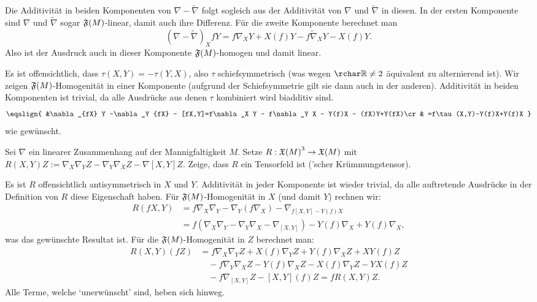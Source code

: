 \documentclass{article}
\begin{document}
\begin{solution}
    \begin{tasks}
        \item
        Die Additivität in beiden Komponenten von $\nabla - \tilde\nabla$ folgt sogleich aus der Additivität von $\nabla$ und $\tilde \nabla$ in diesen. In der ersten Komponente sind $\nabla$ und $\tilde \nabla$ sogar $\mathfrak{F}(M)$-linear, damit auch ihre Differenz. Für die zweite Komponente berechnet man
        $$
        {(\nabla-\tilde\nabla)}_X {fY}=f\nabla_X Y+X(f)Y-f\tilde\nabla_X Y -X(f)Y.
        $$
        Also ist der Ausdruck auch in dieser Komponente $\mathfrak{F}(M)$-homogen und damit linear.
            \item
        Es ist offensichtlich, dass $\tau(X,Y)=-\tau(Y,X)$, also $\tau$ schiefsymmetrisch (was wegen $\rchar\reals\neq 2$ äquivalent zu alternierend ist). Wir zeigen $\mathfrak{F}(M)$-Homogenität in einer Komponente (aufgrund der Schiefsymmetrie gilt sie dann auch in der anderen). Additivität in beiden Komponenten ist trivial, da alle Ausdrücke aus denen $\tau$ kombiniert wird biadditiv sind.
        $$
        \eqalign{
            &\nabla_{fX} Y -\nabla_Y {fX} - [fX,Y]=f\nabla_X Y - f\nabla_Y X - Y(f)X - (fX)Y+Y(fX)\cr
            & =f\tau(X,Y)-Y(f)X+Y(f)X  
        }
        $$
        wie gewünscht.
    \end{tasks}
\end{solution}

\begin{exercise}
    Sei $\nabla$ ein linearer Zusammenhang auf der Mannigfaltigkeit $M$.
    Setze $R:{\mathfrak{X}(M)}^3\rightarrow\mathfrak{X}(M)$ mit $R(X,Y)Z:=\nabla_X\nabla_Y Z - \nabla_Y\nabla_X Z -\nabla{[X,Y]} Z$. Zeige, dass $R$ ein Tensorfeld ist ('scher Krümmungstensor).
\end{exercise}

\begin{solution}
    Es ist $R$ offensichtlich antisymmetrisch in $X$ und $Y$. Additivität in jeder Komponente ist wieder trivial, da alle auftretende Ausdrücke in der Definition von $R$ diese Eigenschaft haben.
    Für $\mathfrak{F}(M)$-Homogenität in $X$ (und damit $Y$) rechnen wir:
    \begin{align*}
        R(fX,Y) & = f\nabla_X\nabla_Y-\nabla_Y(f\nabla_X)-\nabla_{f[X,Y]-Y(f)X}\\
        & = f(\nabla_X\nabla_Y-\nabla_Y\nabla_X-\nabla_{[X,Y]})-Y(f)\nabla_X+Y(f)\nabla_X,
    \end{align*}
    was das gewünschte Resultat ist.
    Für die $\mathfrak{F}(M)$-Homogenität in $Z$ berechnet man:
    \begin{align*}
        R(X,Y)(fZ) & = f\nabla_X\nabla_Y Z+X(f)\nabla_Y Z+Y(f)\nabla_X Z+XY(f) Z\\
        & \quad -f\nabla_Y\nabla_X Z-Y(f)\nabla_X Z-X(f)\nabla_Y Z-YX(f) Z\\
        & \quad -f\nabla_{[X,Y]} Z-[X,Y](f) Z = fR(X,Y) Z.
    \end{align*}
    Alle Terme, welche `unerwünscht' sind, heben sich hinweg.
\end{solution}
\end{document}
